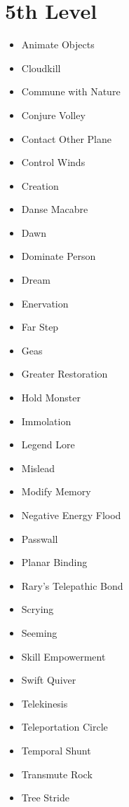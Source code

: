 \documentclass[a4paper,10pt,twoside,twocolumn, bg=print]{dndbook} %
\begin{document}
		\section{5th Level}
			\begin{itemize}
				\item Animate Objects
				\item Cloudkill
				\item Commune with Nature
				\item Conjure Volley
				\item Contact Other Plane
				\item Control Winds
				\item Creation
				\item Danse Macabre
				\item Dawn
				\item Dominate Person
				\item Dream
				\item Enervation
				\item Far Step
				\item Geas
				\item Greater Restoration
				\item Hold Monster
				\item Immolation
				\item Legend Lore
				\item Mislead
				\item Modify Memory
				\item Negative Energy Flood
				\item Passwall
				\item Planar Binding
				\item Rary's Telepathic Bond
				\item Scrying
				\item Seeming
				\item Skill Empowerment
				\item Swift Quiver
				\item Telekinesis
				\item Teleportation Circle
				\item Temporal Shunt
				\item Transmute Rock
				\item Tree Stride
			\end{itemize}
\end{document}
